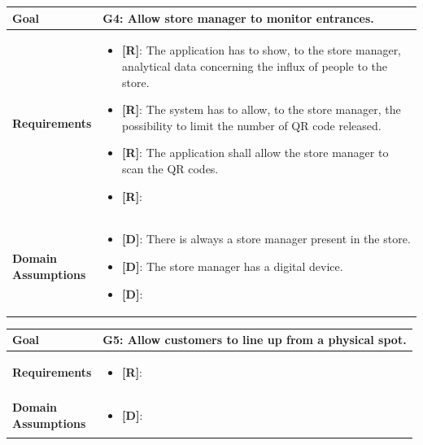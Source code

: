 \begin{table}[H]
\centering
\begin{tabular}{| m{} | m{} |} 
	\hline
	\textbf{Goal} &
		\textbf{G4: Allow store manager to monitor entrances.} \\
	\hline
	\textbf{Requirements} &
		\begin{itemize}
			\item {\textbf{[R]}}: The application has to show, to the store manager, analytical data concerning the influx of people to the store.
			\item {\textbf{[R]}}: The system has to allow, to the store manager, the possibility to limit the number of QR code released.
			\item {\textbf{[R]}}: The application shall allow the store manager to scan the QR codes.
			\item {\textbf{[R]}}:
		\end{itemize} \\ 
	\hline
	\shortstack[l]{\textbf{Domain} \\ \textbf{Assumptions}} & 
		\begin{itemize}
			\item {\textbf{[D]}}: There is always a store manager present in the store.
			\item {\textbf{[D]}}: The store manager has a digital device.
			\item {\textbf{[D]}}:
		\end{itemize} \\ 
	\hline
\end{tabular}
\end{table}

\begin{table}[H]
\centering
\begin{tabular}{| m{} | m{} |} 
	\hline
	\textbf{Goal} &
		\textbf{G5: Allow customers to line up from a physical spot.} \\
	\hline
	\textbf{Requirements} &
		\begin{itemize}
			\item {\textbf{[R]}}:
		\end{itemize} \\ 
	\hline
	\shortstack[l]{\textbf{Domain} \\ \textbf{Assumptions}} & 
		\begin{itemize}
			\item {\textbf{[D]}}:
		\end{itemize} \\ 
	\hline
\end{tabular}
\end{table}

